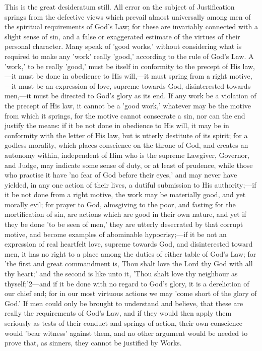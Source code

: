 \documentclass[
]{book}
\begin{document}
This is the great desideratum still. All error on the subject of Justification springs from the defective views which prevail almost universally among men of the spiritual requirements of God's Law; for these are invariably connected with a slight sense of sin, and a false or exaggerated estimate of the virtues of their personal character. Many speak of 'good works,' without considering what is required to make any 'work' really 'good,' according to the rule of God's Law. A 'work,' to be really 'good,' must be itself in conformity to the precept of His law,---it must be done in obedience to His will,---it must spring from a right motive,---it must be an expression of love, supreme towards God, disinterested towards men,---it must be directed to God's glory as its end. If any work be a violation of the precept of His law, it cannot be a 'good work,' whatever may be the motive from which it springs, for the motive cannot consecrate a sin, nor can the end justify the means: if it be not done in obedience to His will, it may be in conformity with the letter of His law, but is utterly destitute of its spirit; for a godless morality, which places conscience on the throne of God, and creates an autonomy within, independent of Him who is the supreme Lawgiver, Governor, and Judge, may indicate some sense of duty, or at least of prudence, while those who practise it have 'no fear of God before their eyes,' and may never have yielded, in any one action of their lives, a dutiful submission to His authority;---if it be not done from a right motive, the work may be materially good, and yet morally evil; for prayer to God, almsgiving to the poor, and fasting for the mortification of sin, are actions which are good in their own nature, and yet if they be done 'to be seen of men,' they are utterly desecrated by that corrupt motive, and become examples of abominable hypocrisy;---if it be not an expression of real heartfelt love, supreme towards God, and disinterested toward men, it has no right to a place among the duties of either table of God's Law; for 'the first and great commandment is, Thou shalt love the Lord thy God with all thy heart;' and the second is like unto it, 'Thou shalt love thy neighbour as thyself;'2---and if it be done with no regard to God's glory, it is a dereliction of our chief end; for in our most virtuous actions we may 'come short of the glory of God.' If men could only be brought to understand and believe, that these are really the requirements of God's Law, and if they would then apply them seriously as tests of their conduct and springs of action, their own conscience would 'bear witness' against them, and no other argument would be needed to prove that, as sinners, they cannot be justified by Works.
\end{document}

